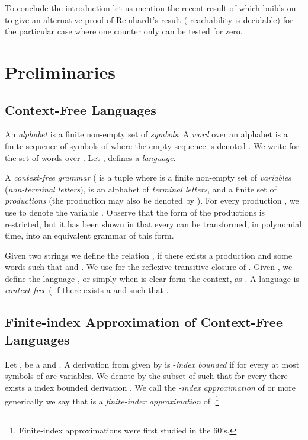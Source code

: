\documentclass{fsttcs}
\begin{document}
To conclude the introduction let us mention the recent result of \cite{RB-mfcs11} which builds on
\cite{LEROUX-POPL2011} to give an alternative proof of Reinhardt's result
( reachability is decidable) for the particular case where one counter
only can be tested for zero.















\section{Preliminaries}\label{sec:prelim}

\subsection{Context-Free Languages}

An \emph{alphabet}  is a finite non-empty set of \emph{symbols}.
A \emph{word}  over an alphabet  is a finite sequence of symbols of
 where the empty sequence is denoted . 
We write  for the set of words over .
Let ,  defines a \emph{language}.  


A \emph{context-free grammar} (  is a tuple
 where  is a finite non-empty set of \emph{variables}
(\emph{non-terminal letters}),  is an alphabet of
\emph{terminal letters}, and  a finite set of \emph{productions} (the
production  may also be denoted by ). For every production , we use  to denote the variable . Observe that the
form of the productions is restricted, but it has been shown in \cite{LL10} that
every  can be transformed, in polynomial time, into an equivalent
grammar of this form.

Given two strings  we define the relation
, if there exists a production  and some words
 such that  and .  We use
 for the reflexive transitive closure of .  
Given , we define the language , or simply 
when  is clear form the context, as . 
A language  is \emph{context-free} ( if there exists a  
 and  such that
.


\subsection{Finite-index Approximation of Context-Free Languages}

Let ,  be a  and
.  A derivation from  given by
 is 
-\emph{index bounded} if for every  at most  symbols of
 are variables.  We denote by  the subset of  such
that for every  there exists a  index bounded derivation
.  We call  the \emph{-index
approximation} of  or more generically we say that  is a
\emph{finite-index approximation} of .\footnote{Finite-index
approximations were first studied in the 60's.} 
\end{document}

